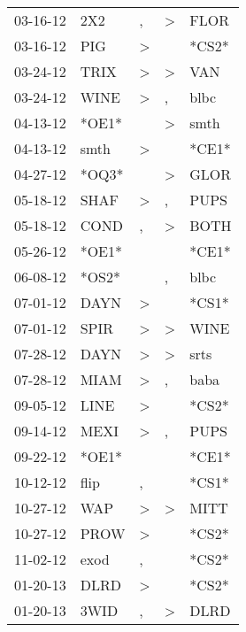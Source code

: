 \begin{supertabular}{lllll}
 03-16-12 &    2X2 &                , &     \textgreater &   FLOR \\
 03-16-12 &    PIG &     \textgreater &                  &  *CS2* \\
 03-24-12 &   TRIX &     \textgreater &     \textgreater &    VAN \\
 03-24-12 &   WINE &     \textgreater &                , &   blbc \\
 04-13-12 &  *OE1* &                  &     \textgreater &   smth \\
 04-13-12 &   smth &     \textgreater &                  &  *CE1* \\
 04-27-12 &  *OQ3* &                  &     \textgreater &   GLOR \\
 05-18-12 &   SHAF &     \textgreater &                , &   PUPS \\
 05-18-12 &   COND &                , &     \textgreater &   BOTH \\
 05-26-12 &  *OE1* &                  &                  &  *CE1* \\
 06-08-12 &  *OS2* &                  &                , &   blbc \\
 07-01-12 &   DAYN &     \textgreater &                  &  *CS1* \\
 07-01-12 &   SPIR &     \textgreater &     \textgreater &   WINE \\
 07-28-12 &   DAYN &     \textgreater &     \textgreater &   srts \\
 07-28-12 &   MIAM &     \textgreater &                , &   baba \\
 09-05-12 &   LINE &     \textgreater &                  &  *CS2* \\
 09-14-12 &   MEXI &     \textgreater &                , &   PUPS \\
 09-22-12 &  *OE1* &                  &                  &  *CE1* \\
 10-12-12 &   flip &                , &                  &  *CS1* \\
 10-27-12 &    WAP &     \textgreater &     \textgreater &   MITT \\
 10-27-12 &   PROW &     \textgreater &                  &  *CS2* \\
 11-02-12 &   exod &                , &                  &  *CS2* \\
 01-20-13 &   DLRD &     \textgreater &                  &  *CS2* \\
 01-20-13 &   3WID &                , &     \textgreater &   DLRD \\

\end{supertabular}
